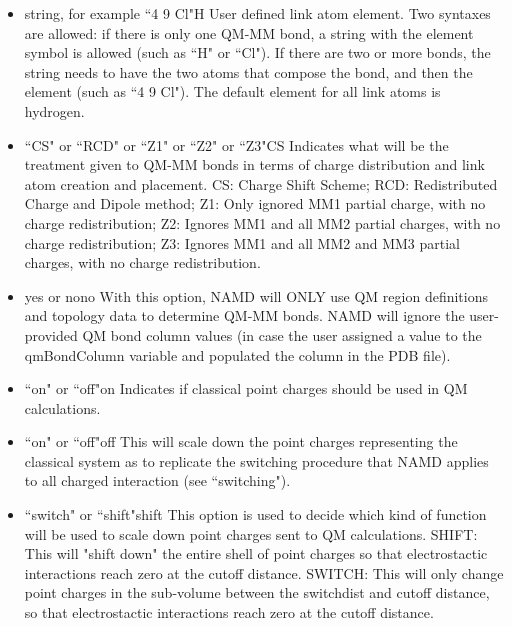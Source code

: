 \begin{itemize}
\item
{}%
{string, for example ``4 9 Cl"}{H}{%
User defined link atom element. Two syntaxes are allowed:
if there is only one QM-MM bond, a string with the element symbol 
is allowed (such as ``H" or ``Cl"). If there are two or more bonds, 
the string needs to have the two atoms that compose the bond, 
and then the element (such as ``4 9 Cl"). 
The default element for all link atoms is hydrogen.
}

\item
{}%
{``CS" or ``RCD" or ``Z1" or ``Z2" or ``Z3"}{CS}{%
Indicates what will be the treatment given to QM-MM bonds in terms 
of charge distribution and link atom creation and placement. 
CS: Charge Shift Scheme; RCD: Redistributed Charge and Dipole method; 
Z1: Only ignored MM1 partial charge, with no charge redistribution; 
Z2: Ignores MM1 and all MM2 partial charges, with no charge redistribution; 
Z3: Ignores MM1 and all MM2 and MM3 partial charges, 
with no charge redistribution.
}

\item
{}%
{yes or no}{no}{%
With this option, NAMD will ONLY use QM region definitions and topology data to
determine QM-MM bonds. NAMD will ignore the user-provided QM bond column values
(in case the user assigned a value to the qmBondColumn variable and populated 
the column in the PDB file).
}

\item
{}%
{``on" or ``off"}{on}{%
Indicates if classical point charges should be used in QM calculations.
}

\item
{}%
{``on" or ``off"}{off}{%
This will scale down the point charges representing the classical 
system as to replicate the switching procedure that NAMD applies 
to all charged interaction (see ``switching").
}

\item
{}%
{``switch" or ``shift"}{shift}{%
This option is used to decide which kind of function will be used 
to scale down point charges sent to QM calculations. 
SHIFT: This will "shift down" the entire shell of point charges 
so that electrostactic interactions reach zero at the cutoff distance. 
SWITCH: This will only change point charges in the sub-volume between 
the switchdist and cutoff distance, so that electrostactic interactions 
reach zero at the cutoff distance.
}


\end{itemize}
